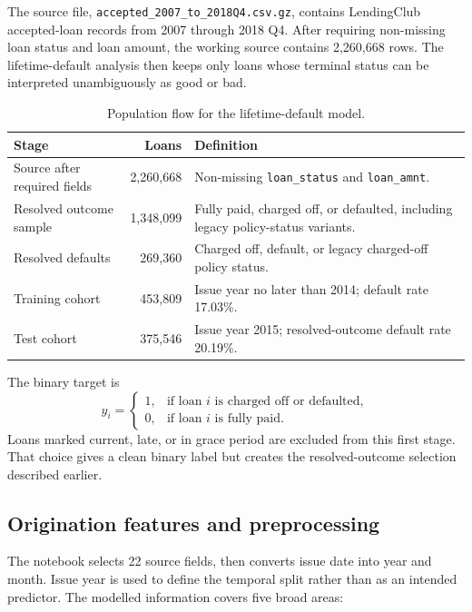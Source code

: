 \documentclass[11pt]{article}
\newcommand{\sourcefile}{\texttt{accepted\_2007\_to\_2018Q4.csv.gz}}
\begin{document}
The source file, \sourcefile, contains LendingClub accepted-loan records from 2007
through 2018 Q4. After requiring non-missing loan status and loan amount, the
working source contains 2,260,668 rows. The lifetime-default analysis then keeps
only loans whose terminal status can be interpreted unambiguously as good or bad.

\begin{table}[H]
\centering
\caption{Population flow for the lifetime-default model.}
\label{tab:population-flow}
\begin{tabular}{lrp{}}
\toprule
Stage & Loans & Definition \\
\midrule
Source after required fields & 2,260,668 & Non-missing \texttt{loan\_status} and \texttt{loan\_amnt}. \\
Resolved outcome sample & 1,348,099 & Fully paid, charged off, or defaulted, including legacy policy-status variants. \\
Resolved defaults & 269,360 & Charged off, default, or legacy charged-off policy status. \\
Training cohort & 453,809 & Issue year no later than 2014; default rate 17.03\%. \\
Test cohort & 375,546 & Issue year 2015; resolved-outcome default rate 20.19\%. \\
\bottomrule
\end{tabular}
\end{table}

The binary target is
\[
  y_i =
  \begin{cases}
    1, & \text{if loan }i\text{ is charged off or defaulted},\\
    0, & \text{if loan }i\text{ is fully paid}.
  \end{cases}
\]
Loans marked current, late, or in grace period are excluded from this first stage.
That choice gives a clean binary label but creates the resolved-outcome selection
described earlier.

\subsection{Origination features and preprocessing}

The notebook selects 22 source fields, then converts issue date into year and
month. Issue year is used to define the temporal split rather than as an intended
predictor. The modelled information covers five broad areas:
\end{document}
